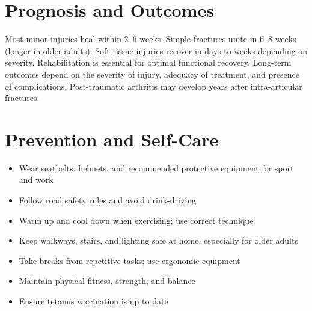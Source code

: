 \section*{Prognosis and Outcomes}
Most minor injuries heal within 2--6 weeks. Simple fractures unite in 6--8 weeks (longer in older adults). Soft tissue injuries recover in days to weeks depending on severity. Rehabilitation is essential for optimal functional recovery. Long-term outcomes depend on the severity of injury, adequacy of treatment, and presence of complications. Post-traumatic arthritis may develop years after intra-articular fractures.

\section*{Prevention and Self-Care}
\begin{itemize}
    \item Wear seatbelts, helmets, and recommended protective equipment for sport and work
    \item Follow road safety rules and avoid drink-driving
    \item Warm up and cool down when exercising; use correct technique
    \item Keep walkways, stairs, and lighting safe at home, especially for older adults
    \item Take breaks from repetitive tasks; use ergonomic equipment
    \item Maintain physical fitness, strength, and balance
    \item Ensure tetanus vaccination is up to date
\end{itemize}
